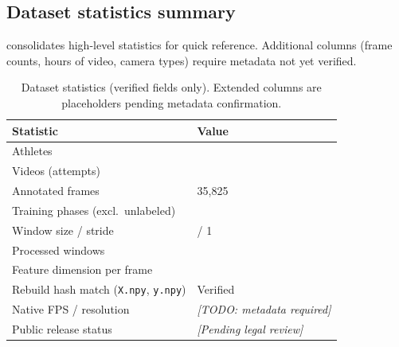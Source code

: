 \subsection{Dataset statistics summary}
\label{sec:dataset:stats}

 consolidates high-level statistics for quick reference.
Additional columns (frame counts, hours of video, camera types) require metadata not yet verified.

\begin{table}[t]
  \centering
  \caption{Dataset statistics (verified fields only). Extended columns are placeholders pending metadata confirmation.}
  \label{tab:dataset_stats}
  \begin{tabular}{ll}
    \toprule
    Statistic & Value \\
    \midrule
    Athletes & \numathletes{} \\
    Videos (attempts) & \numvideos{} \\
    Annotated frames & 35{,}825 \\
    Training phases (excl.\ unlabeled) & \numclasses{} \\
    Window size / stride & \windowsize{} / 1 \\
    Processed windows & \numwindows{} \\
    Feature dimension per frame & \featuredim{} \\
    Rebuild hash match (\texttt{X.npy}, \texttt{y.npy}) & Verified \\
    Native FPS / resolution & \textit{[TODO: metadata required]} \\
    Public release status & \textit{[Pending legal review]} \\
    \bottomrule
  \end{tabular}
\end{table}

